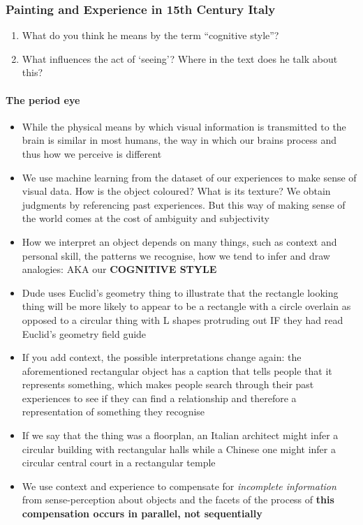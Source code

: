 \documentclass[a4paper]{article}
\begin{document}
\subsubsection{Painting and Experience in 15th Century Italy}
\begin{enumerate}
	\item What do you think he means by the term ``cognitive style''?
	\item What influences the act of `seeing'? Where in the text does he talk about this?
\end{enumerate}

\paragraph{The period eye}
\begin{itemize}
	\item While the physical means by which visual information is transmitted to the brain is similar in most humans, the way in which our brains process and thus how we perceive is different
	\item We use machine learning from the dataset of our experiences to make sense of visual data. How is the object coloured? What is its texture? We obtain judgments by referencing past experiences. But this way of making sense of the world comes at the cost of ambiguity and subjectivity
	\item How we interpret an object depends on many things, such as context and personal skill, the patterns we recognise, how we tend to infer and draw analogies: AKA our \textbf{COGNITIVE STYLE}
	\item Dude uses Euclid's geometry thing to illustrate that the rectangle looking thing will be more likely to appear to be a rectangle with a circle overlain as opposed to a circular thing with L shapes protruding out IF they had read Euclid’s geometry field guide
	\item If you add context, the possible interpretations change again: the aforementioned rectangular object has a caption that tells people that it represents something, which makes people search through their past experiences to see if they can find a relationship and therefore a representation of something they recognise
	\item If we say that the thing was a floorplan, an Italian architect might infer a circular building with rectangular halls while a Chinese one might infer a circular central court in a rectangular temple
	\item We use context and experience to compensate for \textit{incomplete information} from sense-perception about objects and the facets of the process of \textbf{this compensation occurs in parallel, not sequentially}

\end{itemize}
\end{document}
